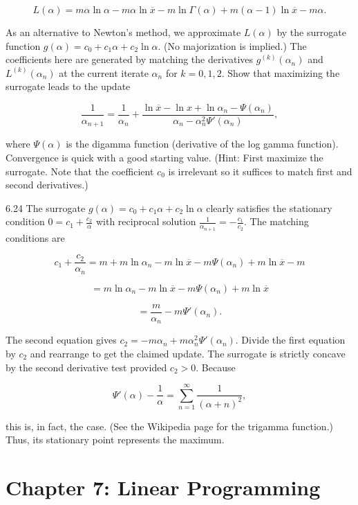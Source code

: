 \documentclass[8pt]{article}
\begin{document}
{\[
L(\alpha) = m \alpha \ln \alpha - m \alpha \ln \overline{x} - m \ln \Gamma(\alpha) + m (\alpha - 1) \ln \overline{x} - m \alpha.
\]

As an alternative to Newton’s method, we approximate \( L(\alpha) \) by the surrogate function \( g(\alpha) = c_0 + c_1 \alpha + c_2 \ln \alpha \). (No majorization is implied.) The coefficients here are generated by matching the derivatives \( g^{(k)}(\alpha_n) \) and \( L^{(k)}(\alpha_n) \) at the current iterate \( \alpha_n \) for \( k = 0, 1, 2 \). Show that maximizing the surrogate leads to the update

\[
\frac{1}{\alpha_{n+1}} = \frac{1}{\alpha_n} + \frac{\ln \overline{x} - \ln x + \ln \alpha_n - \Psi(\alpha_n)}{\alpha_n - \alpha_n^2 \Psi'(\alpha_n)},
\]

where \( \Psi(\alpha) \) is the digamma function (derivative of the log gamma function). Convergence is quick with a good starting value. (Hint: First maximize the surrogate. Note that the coefficient \( c_0 \) is irrelevant so it suffices to match first and second derivatives.)

6.24 The surrogate \( g(\alpha) = c_0 + c_1 \alpha + c_2 \ln \alpha \) clearly satisfies the stationary condition \( 0 = c_1 + \frac{c_2}{\alpha} \) with reciprocal solution \( \frac{1}{\alpha_{n+1}} = -\frac{c_1}{c_2} \). The matching conditions are

\[
c_1 + \frac{c_2}{\alpha_n} = m + m \ln \alpha_n - m \ln \overline{x} - m \Psi(\alpha_n) + m \ln \overline{x} - m
\]

\[
= m \ln \alpha_n - m \ln \overline{x} - m \Psi(\alpha_n) + m \ln \overline{x}
\]

\[
= \frac{m}{\alpha_n} - m \Psi'(\alpha_n).
\]

The second equation gives \( c_2 = -m \alpha_n + m \alpha_n^2 \Psi'(\alpha_n) \). Divide the first equation by \( c_2 \) and rearrange to get the claimed update. The surrogate is strictly concave by the second derivative test provided \( c_2 > 0 \). Because

\[
\Psi'(\alpha) - \frac{1}{\alpha} = \sum_{n=1}^{\infty} \frac{1}{(\alpha + n)^2},
\]

this is, in fact, the case. (See the Wikipedia page for the trigamma function.) Thus, its stationary point represents the maximum.

\newpage
\section*{Chapter 7: Linear Programming}

}
\end{document}
